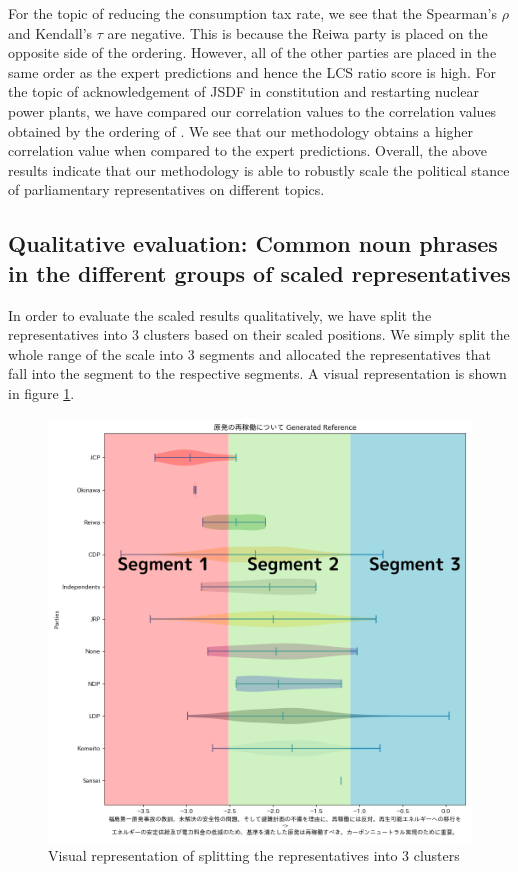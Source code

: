 \documentclass[final,5p,times,twocolumn,authoryear]{elsarticle}
\begin{document}
For the topic of reducing the consumption tax rate, we see that the Spearman's $\rho$ and Kendall's $\tau$ are negative. This is because the Reiwa party is placed on the opposite side of the ordering. However, all of the other parties are placed in the same order as the expert predictions and hence the LCS ratio score is high. For the topic of acknowledgement of JSDF in constitution and restarting nuclear power plants, we have compared our correlation values to the correlation values obtained by the ordering of \citeauthor{kato2024lupinllmbasedpoliticalideology}. We see that our methodology obtains a higher correlation value when compared to the expert predictions. Overall, the above results indicate that our methodology is able to robustly scale the political stance of parliamentary representatives on different topics.

\subsection{Qualitative evaluation: Common noun phrases in the different groups of scaled representatives}
\label{section: qual-eval}
In order to evaluate the scaled results qualitatively, we have split the representatives into 3 clusters based on their scaled positions. We simply split the whole range of the scale into 3 segments and allocated the representatives that fall into the segment to the respective segments. A visual representation is shown in figure \ref{fig:3clusters}.

\begin{figure}
\centering
  \centering
  \includegraphics[width=0.8\linewidth]{figs/Segment 1.png}
  \caption{Visual representation of splitting the representatives into 3 clusters}
  \label{fig:3clusters}
\end{figure}
\end{document}
